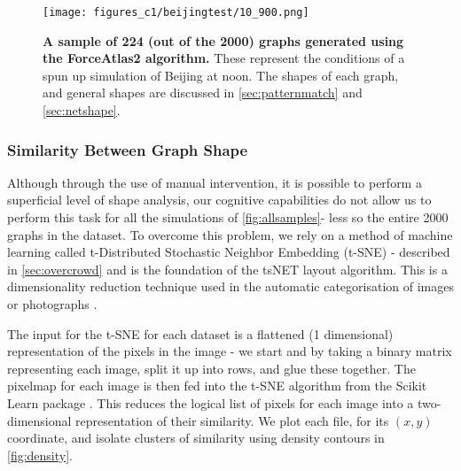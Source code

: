     \begin{figure}[H]
         \centering
     \texttt{[image: figures\_c1/beijingtest/10\_900.png]}
     \caption{\textbf{A sample of 224 (out of the 2000) graphs generated using the ForceAtlas2 algorithm.} These represent the conditions of a spun up simulation of Beijing at noon. The shapes of each graph, and general shapes are discussed in \autoref{sec:patternmatch} and \autoref{sec:netshape}.}
     \label{fig:allsamples}
     \end{figure}




\subsubsection{Similarity Between Graph Shape}\label{sec:patternmatch}
Although through the use of manual intervention, it is possible to perform a superficial level of shape analysis, our cognitive capabilities do not allow us to perform this task for all the simulations of \autoref{fig:allsamples}- less so the entire 2000 graphs in the dataset. To overcome this problem, we rely on a method of machine learning called t-Distributed Stochastic Neighbor Embedding (t-SNE) - described in \autoref{sec:overcrowd} and is the foundation of the tsNET layout algorithm. This is a dimensionality reduction technique used in the automatic categorisation of images or photographs \citep{truthandbeauty,sketchy}.

The input for the t-SNE for each dataset is a flattened (1 dimensional) representation of the pixels in the image - we start and by taking a binary matrix representing each image, split it up into rows, and glue these together. The pixelmap for each image is then fed into the t-SNE algorithm from the Scikit Learn package \citep{scikit-learn}. This reduces the logical list of pixels for each image into a two-dimensional representation of their similarity. We plot each file, for its $(x,y)$ coordinate, and isolate clusters of similarity using density contours in \autoref{fig:density}.

